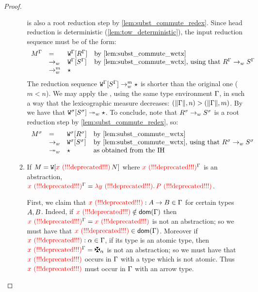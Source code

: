 \begin{proof}
\begin{enumerate}
\begin{enumerate}
    is also a root reduction step by \cref{lem:subst_commute_redex}.
    Since head reduction is deterministic (\cref{lem:tow_deterministic}),
    the input reduction sequence must be of the form:
    \[
      \begin{array}{rlll}
        \subs{\utm}{\tenv}
      & = &
        \ctxof{\subs{\wctx}{\tenv}}{\subs{\utmfive}{\tenv}}
        & \text{by \cref{lem:subst_commute_wctx}}
      \\
      & \tow &
        \ctxof{\subs{\wctx}{\tenv}}{\subs{\utmsix}{\tenv}}
        & \text{by \cref{lem:subst_commute_wctx}, using that $\subs{\utmfive}{\tenv} \tow \subs{\utmsix}{\tenv}$}
      \\
      & \tow^m &
        \iunit
      \end{array}
    \]
    The reduction sequence
    $\mathtt{W}^{\Gamma}[S^{\Gamma}] \to_{w}^m \star$
    is shorter than the original one ($m < n$).
    We may apply the \ih, using the same type environment $\Gamma$,
    in such a way that the lexicographic measure decreases:
    $(\lVert\Gamma\rVert,n) > (\lVert\Gamma\rVert,m)$.
    By \ih we have that
    $\mathtt{W}^{\sigma}[S^{\sigma}] \twoheadrightarrow_{w} \star$.
    To conclude, note that
    $R^{\sigma} \to_{w} S^{\sigma}$
    is a root reduction step by \cref{lem:subst_commute_redex},
    so:
    \[
      \begin{array}{rlll}
        \subs{\utm}{\subst}
      & = &
        \ctxof{\subs{\wctx}{\subst}}{\subs{\utmfive}{\subst}}
        & \text{by \cref{lem:subst_commute_wctx}}
      \\
      & \tow &
        \ctxof{\subs{\wctx}{\subst}}{\subs{\utmsix}{\subst}}
        & \text{by \cref{lem:subst_commute_wctx}, using that $\subs{\utmfive}{\subst} \tow \subs{\utmsix}{\subst}$}
      \\
      & \tows &
        \iunit
        & \text{as obtained from the \ih}
      \end{array}
    \]
  \item
    If $M = \mathtt{W}[\textcolor{red}{x \text{\,\,(!!!deprecated!!!)}}\,N]$
    where $\textcolor{red}{x \text{\,\,(!!!deprecated!!!)}}^{\Gamma}$ is an abstraction,
    \ie $\textcolor{red}{x \text{\,\,(!!!deprecated!!!)}}^{\Gamma} = \textcolor{red}{\lambda \textcolor{red}{y \text{\,\,(!!!deprecated!!!)}}.\,P \text{\,\,(!!!deprecated!!!)}}$.

    First, we claim that $\textcolor{red}{x \text{\,\,(!!!deprecated!!!)}} : A\to B \in \Gamma$
    for certain types $A,B$.
    Indeed, if $\textcolor{red}{x \text{\,\,(!!!deprecated!!!)}} \notin \mathsf{dom}(\Gamma)$ then $\textcolor{red}{x \text{\,\,(!!!deprecated!!!)}}^{\Gamma} = \textcolor{red}{x \text{\,\,(!!!deprecated!!!)}}$
    is not an abstraction; so we must have that $\textcolor{red}{x \text{\,\,(!!!deprecated!!!)}} \in \mathsf{dom}(\Gamma)$.
    Moreover if $\textcolor{red}{x \text{\,\,(!!!deprecated!!!)}} : \alpha \in \Gamma$, \ie if its type is an atomic type,
    then $\subs{\var}{\tenv} = \genbtyp$ is not an abstraction;
    so we must have that $\textcolor{red}{x \text{\,\,(!!!deprecated!!!)}}$ occurs in $\Gamma$ with a type which is not atomic.
    Thus $\textcolor{red}{x \text{\,\,(!!!deprecated!!!)}}$ must occur in $\Gamma$ with an arrow type.


\end{enumerate}
\end{enumerate}
\end{proof}

